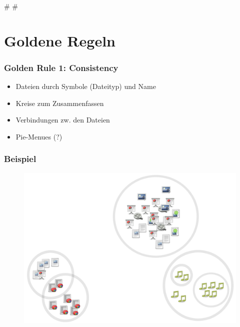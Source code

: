 
\def\mytitle{File Network: Reflexion der Usability Guidelines}
\def\myauthor{Anastasia Kazakova, Bengt Lüers}
\def\latexmode{beamer}
\def\latexxslt{beamer}
\def\theme{keynote-IntSysTheme}

\def\bibliostyle{chicago}

\# \#

\section{Goldene Regeln}
\label{goldeneregeln}

\begin{frame}

\frametitle{Golden Rule 1: Consistency}
\label{goldenrule1:consistency}

\begin{itemize}
\item Dateien durch Symbole (Dateityp) und Name

\item Kreise zum Zusammenfassen

\item Verbindungen zw. den Dateien

\item Pie-Menues (?)

\end{itemize}

\end{frame}

\begin{frame}

\frametitle{Beispiel}
\label{beispiel}

\begin{figure}[htbp]
\centering
\includegraphics[keepaspectratio,width=\textwidth,height=0.75\textheight]{01.png}
\label{}
\end{figure}


\end{frame}

